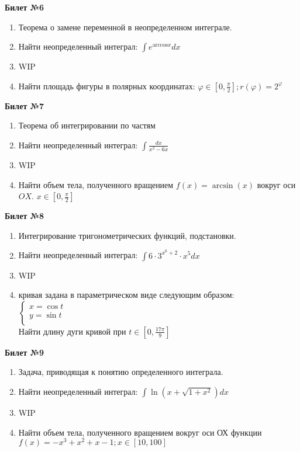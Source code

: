 \documentclass[a4paper, 12pt]{article}
\begin{document}
\begin{center}
	\textbf{Билет №6}
\end{center}
\begin{enumerate}
	\item Теорема о замене переменной в неопределенном интеграле.
	\item Найти неопределенный интеграл: $\displaystyle \int{e^{\text{arccos}x} dx}$
	\item WIP
	\item Найти площадь фигуры в полярных координатах: $\displaystyle \varphi \in \left[0, \frac{\pi}{2}\right]; r(\varphi) = 2^\varphi$
\end{enumerate}

\begin{center}
	\textbf{Билет №7}
\end{center}
\begin{enumerate}
	\item Теорема об интегрировании по частям 
	\item Найти неопределенный интеграл: $\displaystyle \int{\frac{dx}{x^2 - 6x}}$
	\item WIP
	\item Найти объем тела, полученного вращением $\displaystyle f(x) = \arcsin(x)$ вокруг оси $OX$. $\displaystyle x \in \left[0, \frac{\pi}{2}\right]$
\end{enumerate}

\begin{center}
	\textbf{Билет №8}
\end{center}
\begin{enumerate}
	\item Интегрирование тригонометрических функций, подстановки.
	\item Найти неопределенный интеграл: $\displaystyle \int{6 \cdot 3^{x^6 + 2} \cdot x^5 dx}$
	\item WIP
	\item кривая задана в параметрическом виде следующим образом: \\
	$
	\begin{cases}
		x = \cos{t} \\
		y=\sin{t} \\
	\end{cases}
	$
	\\
	Найти длину дуги кривой при $\displaystyle t \in \left[0, \frac{17\pi}{9}\right]$
\end{enumerate}

\begin{center}
	\textbf{Билет №9}
\end{center}
\begin{enumerate}
	\item Задача, приводящая к понятию определенного интеграла.
	\item Найти неопределенный интеграл: $\displaystyle \int{\ln (x + \sqrt{1 + x^2}) dx}$
	\item WIP
	\item Найти объем тела, полученного вращением вокруг оси ОХ функции $\displaystyle f(x) = - x ^ {3} + x^2 + x -1; x \in \left[10,100\right]$
\end{enumerate}
\end{document}

